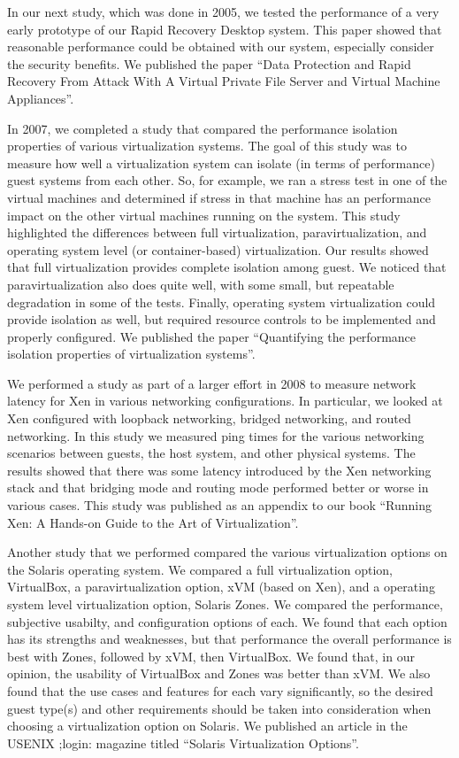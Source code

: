 In our next study, which was done in 2005, we tested the performance of a very early prototype  
 of our Rapid Recovery Desktop system. This paper showed that reasonable performance could be obtained with our system, especially consider the security benefits. We published the paper
``Data Protection and Rapid Recovery From Attack With A Virtual Private File Server and Virtual Machine Appliances''\cite{rapid_recovery_paper_05}.

In 2007, we completed a study that compared the performance isolation properties of various virtualization systems. The goal of this study was to measure how well a virtualization system can isolate (in terms of performance) guest systems from each other. So, for example, we ran a stress test in one of the virtual machines and determined if stress in that machine has an performance impact on the other virtual machines running on the system. This study highlighted the differences between full virtualization, paravirtualization, and operating system level (or container-based) virtualization. Our results showed that full virtualization provides complete isolation among guest. We noticed that paravirtualization also does quite well, with some small, but repeatable degradation in some of the tests. Finally, operating system virtualization could provide isolation as well, but required resource controls to be implemented and properly configured. We published the paper ``Quantifying the performance isolation properties of virtualization systems''\cite{isolation_paper_2007}.

We performed a study as part of a larger effort in 2008 to measure network latency for Xen in various networking configurations. In particular, we looked at Xen configured with loopback networking, bridged networking, and routed networking. In this study we measured ping times for the various networking scenarios between guests, the host system, and other physical systems. The results showed that there was some latency introduced by the Xen networking stack and that bridging mode and routing mode performed better or worse in various cases. This study was published as an appendix to our book ``Running Xen: A Hands-on Guide to the Art of Virtualization''\cite{runningxen_book}.

Another study that we performed compared the various virtualization options on the Solaris operating system. We compared a full virtualization option, VirtualBox, a paravirtualization option, xVM (based on Xen), and a operating system level virtualization option, Solaris Zones. We compared the performance, subjective usabilty, and configuration options of each. We found that each option has its strengths and weaknesses, but that performance the overall performance is best with Zones, followed by xVM, then VirtualBox. We found that, in our opinion, the usability of VirtualBox and Zones was better than xVM. We also found that the use cases and features for each vary significantly, so the desired guest type(s) and other requirements should be taken into consideration when choosing a virtualization option on Solaris. We published an article in the USENIX ;login: magazine titled ``Solaris Virtualization Options''\cite{solaris_virt_options_2008}.


